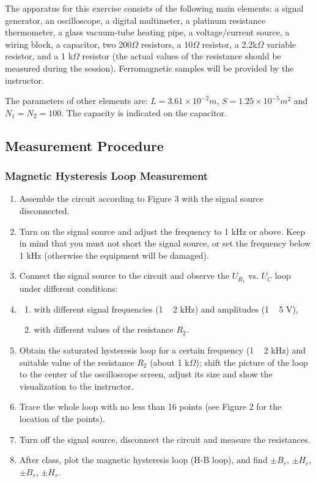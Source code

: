 \documentclass{article}
\begin{document}
The apparatus for this exercise consists of the following main elements: a signal generator, an oscilloscope, a digital multimeter, a platinum resistance thermometer, a glass vacuum-tube heating pipe, a voltage/current source, a wiring block, a capacitor, two 200$\Omega$ resistors, a 10$\Omega$  resistor, a 2.2k$\Omega$ variable resistor, and a 1 k$\Omega$ resistor (the actual values of the resistance should be measured during the session). Ferromagnetic samples will be provided by the instructor.

The parameters of other elements are: $L = 3.61 \times 10^{-2} m$, $S = 1.25 \times 10^{-5} m^2$ and
$N_1 = N_2 = 100$. The capacity is indicated on the capacitor.

\subsection{Measurement Procedure}

\subsubsection{Magnetic Hysteresis Loop Measurement}
\begin{enumerate}
	\item Assemble the circuit according to Figure 3 with the signal source disconnected.
	\item Turn on the signal source and adjust the frequency to 1 kHz or above. Keep in
mind that you must not short the signal source, or set the frequency below 1 kHz
(otherwise the equipment will be damaged).
	\item Connect the signal source to the circuit and observe the $U_{R_1}$ vs. $U_C$ loop under different conditions:
	\item
	\begin{enumerate}[(1)]
		\item with different signal frequencies (1 ~ 2 kHz) and amplitudes (1 ~ 5 V),
		\item with different values of the resistance $R_2$.
	\end{enumerate}
	\item Obtain the saturated hysteresis loop for a certain frequency (1 ~ 2 kHz) and
suitable value of the resistance $R_2$ (about 1 k$\Omega$); shift the picture of the loop to the center of the oscilloscope screen, adjust its size and show the visualization to the instructor.
	\item Trace the whole loop with no less than 16 points (see Figure 2 for the location of the points).
	\item Turn off the signal source, disconnect the circuit and measure the resistances.
	\item After class, plot the magnetic hysteresis loop (H-B loop), and find $\pm B_r$, $\pm H_c$, $\pm B_s$, $\pm H_s$.
\end{enumerate}
\end{document}
